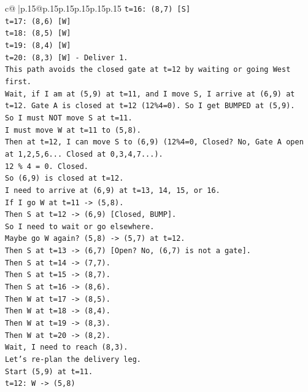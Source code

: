 \documentclass{article}
\begin{document}
{\begin{supertabular}{c@{$\;$}|p{.15\linewidth}@{}p{.15\linewidth}p{.15\linewidth}p{.15\linewidth}p{.15\linewidth}p{.15\linewidth}}
{{{\texttt{t=16: (8,7) {[}S{]}} \\
\texttt{t=17: (8,6) {[}W{]}} \\
\texttt{t=18: (8,5) {[}W{]}} \\
\texttt{t=19: (8,4) {[}W{]}} \\
\texttt{t=20: (8,3) {[}W{]} {-} Deliver 1.} \\
\texttt{This path avoids the closed gate at t=12 by waiting or going West first.} \\
\texttt{Wait, if I am at (5,9) at t=11, and I move S, I arrive at (6,9) at t=12. Gate A is closed at t=12 (12\%4=0). So I get BUMPED at (5,9).} \\
\texttt{So I must NOT move S at t=11.} \\
\texttt{I must move W at t=11 to (5,8).} \\
\texttt{Then at t=12, I can move S to (6,9) (12\%4=0, Closed? No, Gate A open at 1,2,5,6... Closed at 0,3,4,7...).} \\
\texttt{12 \% 4 = 0. Closed.} \\
\texttt{So (6,9) is closed at t=12.} \\
\texttt{I need to arrive at (6,9) at t=13, 14, 15, or 16.} \\
\texttt{If I go W at t=11 {-}> (5,8).} \\
\texttt{Then S at t=12 {-}> (6,9) {[}Closed, BUMP{]}.} \\
\texttt{So I need to wait or go elsewhere.} \\
\texttt{Maybe go W again? (5,8) {-}> (5,7) at t=12.} \\
\texttt{Then S at t=13 {-}> (6,7) {[}Open? No, (6,7) is not a gate{]}.} \\
\texttt{Then S at t=14 {-}> (7,7).} \\
\texttt{Then S at t=15 {-}> (8,7).} \\
\texttt{Then S at t=16 {-}> (8,6).} \\
\texttt{Then W at t=17 {-}> (8,5).} \\
\texttt{Then W at t=18 {-}> (8,4).} \\
\texttt{Then W at t=19 {-}> (8,3).} \\
\texttt{Then W at t=20 {-}> (8,2).} \\
\texttt{Wait, I need to reach (8,3).} \\
\texttt{Let's re{-}plan the delivery leg.} \\
\texttt{Start (5,9) at t=11.} \\
\texttt{t=12: W {-}> (5,8)} \\
}}}
\end{supertabular}}
\end{document}
